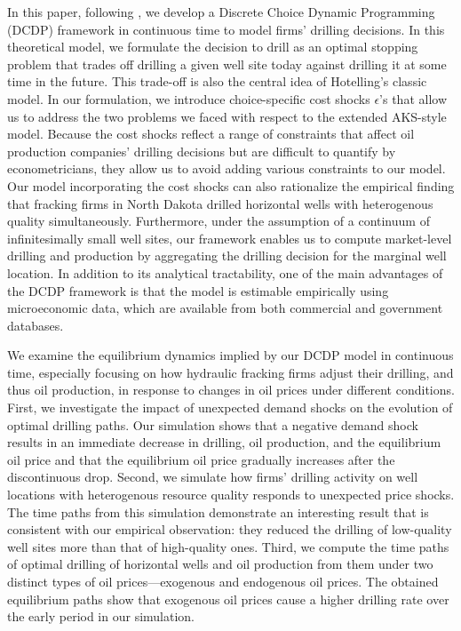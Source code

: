 In this paper, following \cite{Estimation-of-Dynamic-Discrete-Choice-Models-in-Continuous-Time_ABBE_2016}, we develop a Discrete Choice Dynamic Programming (DCDP) framework in continuous time to model firms' drilling decisions. In this theoretical model, we formulate the decision to drill as an optimal stopping problem that trades off drilling a given well site today against drilling it at some time in the future. This trade-off is also the central idea of Hotelling's classic model. In our formulation, we introduce choice-specific cost shocks $\epsilon$'s that allow us to address the two problems we faced with respect to the extended AKS-style model. Because the cost shocks reflect a range of constraints that affect oil production companies' drilling decisions but are difficult to quantify by econometricians, they allow us to avoid adding various constraints to our model. Our model incorporating the cost shocks can also rationalize the empirical finding that fracking firms in North Dakota drilled horizontal wells with heterogenous quality simultaneously. Furthermore, under the assumption of a continuum of infinitesimally small well sites, our framework enables us to compute market-level drilling and production by aggregating the drilling decision for the marginal well location. In addition to its analytical tractability, one of the main advantages of the DCDP framework is that the model is estimable empirically using microeconomic data, which are available from both commercial and government databases. 

We examine the equilibrium dynamics implied by our DCDP model in continuous time, especially focusing on how hydraulic fracking firms adjust their drilling, and thus oil production, in response to changes in oil prices under different conditions. First, we investigate the impact of unexpected demand shocks on the evolution of optimal drilling paths. Our simulation shows that a negative demand shock results in an immediate decrease in drilling, oil production, and the equilibrium oil price and that the equilibrium oil price gradually increases after the discontinuous drop. Second, we simulate how firms' drilling activity on well locations with heterogenous resource quality responds to unexpected price shocks. The time paths from this simulation demonstrate an interesting result that is consistent with our empirical observation: they reduced the drilling of low-quality well sites more than that of high-quality ones. Third, we compute the time paths of optimal drilling of horizontal wells and oil production from them under two distinct types of oil prices---exogenous and endogenous oil prices. The obtained equilibrium paths show that exogenous oil prices cause a higher drilling rate over the early period in our simulation. 

